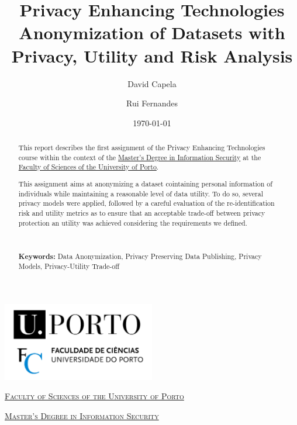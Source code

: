 \documentclass[a4paper, 11pt]{article}
\title{Privacy Enhancing Technologies \\ [0.8em] \smaller{} Anonymization of 
Datasets with Privacy, Utility and Risk Analysis}
\author{David Capela \and Rui Fernandes}
\date{\today}
\begin{document}
\renewcommand\labelitemi{--}
\renewcommand{\nomname}{Acronyms}
\newcommand{\hlgreen}[1]{{\sethlcolor{green}\hl{#1}}}

\renewcommand{\today}{\ifcase \month\or January\or February\or March\or %
April\or May\or June\or July\or August\or September\or October\or November\or %
December\fi, \number \year}

\begin{titlepage}
    \begin{center}
        \begin{minipage}{.75\linewidth}
            \centering
            \includegraphics[width=0.5\textwidth]{img/fcup.png}\par\vspace{1cm}
            \vspace{1.5cm}
            \href{https://sigarra.up.pt/fcup/pt/web_page.Inicial}{\scshape\LARGE Faculty of Sciences of the University of Porto} \par
            \vspace{1cm}
            \href{https://msi.dcc.fc.up.pt/}{\scshape\Large Master's Degree in Information Security} \par
            \vspace{1.5cm}
            \maketitle
        \end{minipage}
    \end{center}
    \vspace{2cm}
    \thispagestyle{empty}
    \pagebreak
\end{titlepage}


\begin{abstract}
This report describes the first assignment of the Privacy Enhancing 
Technologies course within the context of the 
\href{https://msi.dcc.fc.up.pt/}{Master's Degree in Information Security} at 
the \href{https://sigarra.up.pt/fcup/pt/web_page.Inicial}{Faculty of Sciences 
of the University of Porto}.

This assignment aims at anonymizing a dataset cointaining personal information 
of individuals while maintaining a reasonable level of data utility. To do so, 
several privacy models were applied, followed by a careful evaluation of the 
re-identification risk and utility metrics as to ensure that an acceptable 
trade-off between privacy protection an utility was achieved considering the 
requirements we defined.

\

\noindent\textbf{Keywords:} Data Anonymization, Privacy Preserving Data Publishing, 
Privacy Models, Privacy-Utility Trade-off
\end{abstract}
\end{document}
